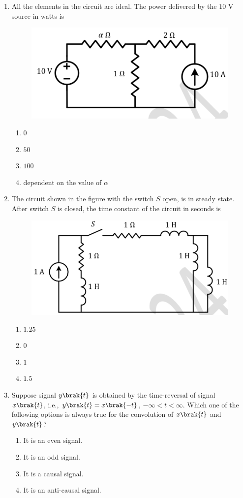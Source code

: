 \documentclass[journal,12pt,onecolumn]{IEEEtran}
\theoremstyle{remark}
\begin{document}
\begin{enumerate}[start=1, label=Q.\arabic*]
    \hfill{}

    \item All the elements in the circuit are ideal. The power delivered by the $10$ V source in watts is
    \begin{figure}[H]
        \centering
        \includegraphics[width=0.5\columnwidth]{Figures/q13.png}
        \caption{}
    \end{figure}
    \begin{enumerate}
        \item $0$
        \item $50$
        \item $100$
        \item dependent on the value of $\alpha$
    \end{enumerate}

    \hfill{}

\item The circuit shown in the figure with the switch $S$ open, is in steady state. After switch $S$ is closed, the time constant of the circuit in seconds is
    \begin{figure}[H]
        \centering
        \includegraphics[width=0.5\columnwidth]{Figures/q14.png}
        \caption{}
    \end{figure}
    \begin{enumerate}
        \item $1.25$
        \item $0$
        \item $1$
        \item $1.5$
    \end{enumerate}

    \hfill{}

    \item Suppose signal $y\brak{t}$ is obtained by the time-reversal of signal $x\brak{t}$, i.e., $y\brak{t} = x\brak{-t}$, $-\infty < t < \infty$. Which one of the following options is always true for the convolution of $x\brak{t}$ and $y\brak{t}$?
    \begin{enumerate}
        \item It is an even signal.
        \item It is an odd signal.
        \item It is a causal signal.
        \item It is an anti-causal signal.
    \end{enumerate}


\end{enumerate}
\end{document}
